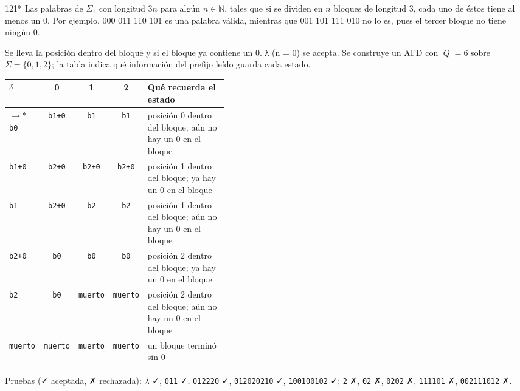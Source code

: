 \documentclass[11pt]{article}
\begin{document}
\begin{ejercicio}{121}{*}
Las palabras de $\Sigma_1$ con longitud $3n$ para algún $n \in \mathbb{N}$, tales que si se dividen en $n$ bloques de longitud 3, cada uno de éstos tiene al menos un 0. Por ejemplo, 000 011 110 101 es una palabra válida, mientras que 001 101 111 010 no lo es, pues el tercer bloque no tiene ningún 0.
\end{ejercicio}
\proc Se lleva la posición dentro del bloque y si el bloque ya contiene un 0. λ (n = 0) se acepta. Se construye un AFD con $|Q| = 6$ sobre $\Sigma = \{0, 1, 2\}$; la tabla indica qué información del prefijo leído guarda cada estado.
\begin{center}\small\begin{tabular}{lcccp{0.42\linewidth}}\toprule
$\delta$ & 0 & 1 & 2 & Qué recuerda el estado \\\midrule
$\to$$*$ \texttt{b0} & \texttt{b1+0} & \texttt{b1} & \texttt{b1} & posición 0 dentro del bloque; aún no hay un 0 en el bloque \\
 \texttt{b1+0} & \texttt{b2+0} & \texttt{b2+0} & \texttt{b2+0} & posición 1 dentro del bloque; ya hay un 0 en el bloque \\
 \texttt{b1} & \texttt{b2+0} & \texttt{b2} & \texttt{b2} & posición 1 dentro del bloque; aún no hay un 0 en el bloque \\
 \texttt{b2+0} & \texttt{b0} & \texttt{b0} & \texttt{b0} & posición 2 dentro del bloque; ya hay un 0 en el bloque \\
 \texttt{b2} & \texttt{b0} & \texttt{muerto} & \texttt{muerto} & posición 2 dentro del bloque; aún no hay un 0 en el bloque \\
 \texttt{muerto} & \texttt{muerto} & \texttt{muerto} & \texttt{muerto} & un bloque terminó sin 0 \\
\bottomrule\end{tabular}\end{center}
Pruebas (✓ aceptada, ✗ rechazada): $\lambda$ ✓, \texttt{011} ✓, \texttt{012220} ✓, \texttt{012020210} ✓, \texttt{100100102} ✓; \texttt{2} ✗, \texttt{02} ✗, \texttt{0202} ✗, \texttt{111101} ✗, \texttt{002111012} ✗.
\end{document}
